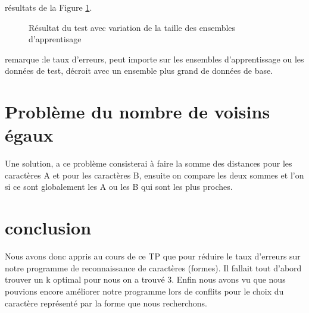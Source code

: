 \documentclass[11pt]{article}
\begin{document}
résultats de la Figure \ref{r2}.

\begin{figure}[H]
\caption{Résultat du test avec  variation de  la taille des ensembles d'apprentisage\label{r2}}	%
\end{figure}

remarque :le taux d'erreurs, peut importe sur les ensembles d'apprentissage ou  les données de test, décroit avec un ensemble plus grand de données de base. 

\section{Problème du nombre de voisins égaux}

Une  solution, a ce problème consisterai à faire la somme des distances pour les caractères A et pour les caractères B, ensuite on compare les deux sommes et l'on si ce sont globalement les A ou les B qui sont les plus proches.

\section{conclusion}
Nous avons donc appris au cours de ce TP que pour réduire le taux d'erreurs sur notre programme de reconnaissance de caractères (formes). Il fallait tout d'abord trouver un k optimal pour nous on a trouvé 3.  Enfin nous avons vu que nous pouvions encore améliorer notre programme lors de conflits pour le choix du caractère représenté par la forme que nous recherchons.
\end{document}
